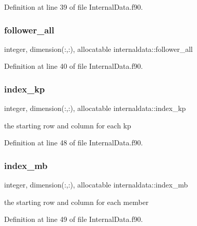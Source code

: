 Definition at line 39 of file Internal\+Data.\+f90.

\mbox{\label{namespaceinternaldata_a2037100926e06d16be5b80c12d0c36e9}} 
\subsubsection{\texorpdfstring{follower\+\_\+all}{follower\_all}}
{\footnotesize\ttfamily integer, dimension(\+:,\+:), allocatable internaldata\+::follower\+\_\+all}



Definition at line 40 of file Internal\+Data.\+f90.

\mbox{\label{namespaceinternaldata_af8b2fe1b76c22e0b7ae0cb514d52b04f}} 
\subsubsection{\texorpdfstring{index\+\_\+kp}{index\_kp}}
{\footnotesize\ttfamily integer, dimension(\+:,\+:), allocatable internaldata\+::index\+\_\+kp}



the starting row and column for each kp 



Definition at line 48 of file Internal\+Data.\+f90.

\mbox{\label{namespaceinternaldata_ac5f95d07b735be7220fcf6814e1ab4a8}} 
\subsubsection{\texorpdfstring{index\+\_\+mb}{index\_mb}}
{\footnotesize\ttfamily integer, dimension(\+:,\+:), allocatable internaldata\+::index\+\_\+mb}



the starting row and column for each member 



Definition at line 49 of file Internal\+Data.\+f90.

